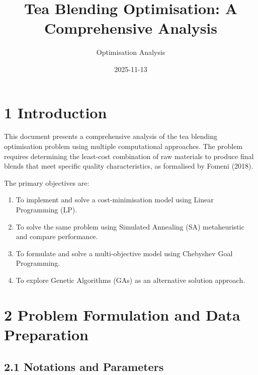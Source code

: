 \documentclass[
]{article}
\title{Tea Blending Optimisation: A Comprehensive Analysis}
\author{Optimisation Analysis}
\date{2025-11-13}
\providecommand{\tightlist}{%
  \setlength{\itemsep}{0pt}\setlength{\parskip}{0pt}}
\begin{document}
\maketitle

{
\setcounter{tocdepth}{2}
\tableofcontents
}
\section{1 Introduction}\label{introduction}

This document presents a comprehensive analysis of the tea blending
optimisation problem using multiple computational approaches. The
problem requires determining the least-cost combination of raw materials
to produce final blends that meet specific quality characteristics, as
formalised by Fomeni (2018).

The primary objectives are:

\begin{enumerate}
\def\labelenumi{\arabic{enumi}.}
\tightlist
\item
  To implement and solve a cost-minimisation model using Linear
  Programming (LP).
\item
  To solve the same problem using Simulated Annealing (SA) metaheuristic
  and compare performance.
\item
  To formulate and solve a multi-objective model using Chebyshev Goal
  Programming.
\item
  To explore Genetic Algorithms (GAs) as an alternative solution
  approach.
\end{enumerate}

\section{2 Problem Formulation and Data
Preparation}\label{problem-formulation-and-data-preparation}

\subsection{2.1 Notations and
Parameters}\label{notations-and-parameters}
\end{document}
